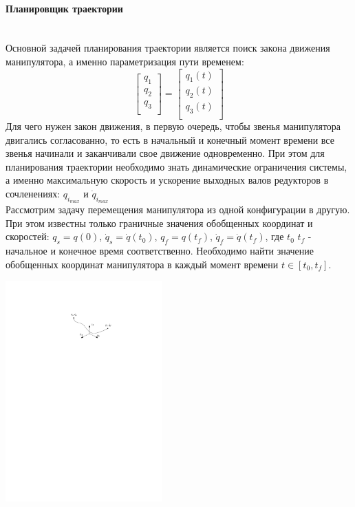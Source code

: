 \paragraph*{Планировщик траектории}$\phantom{-}$\\
\hspace*{\parindent} Основной задачей планирования траектории является поиск закона движения манипулятора, а именно параметризация пути временем:
\begin{equation}\label{eq:model}
    \begin{bmatrix}
    q_{1} \\
    q_{2} \\
    q_{3} \\
    \end{bmatrix}
    =
     \begin{bmatrix}
    q_{1}(t) \\
    q_{2}(t) \\
    q_{3}(t) \\
    \end{bmatrix}
\end{equation} 
Для чего нужен закон движения, в первую очередь, чтобы звенья манипулятора двигались согласованно, то есть в начальный и конечный момент времени все звенья начинали и заканчивали свое движение одновременно.
При этом для планирования траектории необходимо знать динамические ограничения системы, а именно максимальную скорость и ускорение выходных валов редукторов в сочленениях: $q_{i_{max}}$ и $\dot{q}_{i_{max}}$\\
Рассмотрим задачу перемещения манипулятора из одной конфигурации в другую. При этом известны только граничные значения обобщенных координат и скоростей: $q_s=q(0)$, $\dot{q}_s=\dot{q}(t_0)$, $q_f=q(t_f)$, $\dot{q}_f=\dot{q}(t_f)$, где $t_0$ $t_f$ - начальное и конечное время соответственно. Необходимо найти значение обобщенных координат манипулятора в каждый момент времени $t\in [t_0, t_f]$.
\begin{center}
    \includegraphics[width=0.45\textwidth]{Lab4/images/trjPlanningbetweenPoint.pdf}\\
\end{center}

